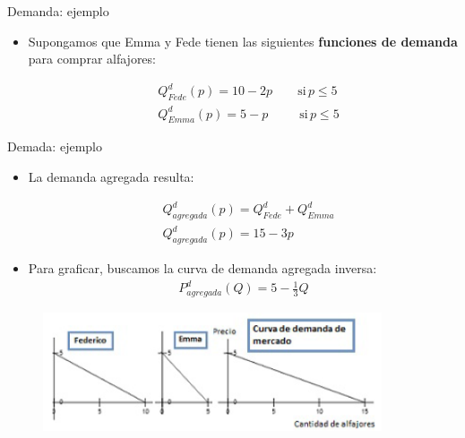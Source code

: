 \documentclass{beamer}
\begin{document}
\begin{frame}{Demanda: ejemplo}
    \begin{itemize}
        \item Supongamos que Emma y Fede tienen las siguientes \textbf{funciones de demanda} para comprar alfajores: 
        
    \begin{align*}
        &Q^{d}_{Fede}(p) = 10-2p \quad \quad \text{si} \, p \leq 5\\
        &Q^{d}_{Emma}(p) = 5-p  \,\,\, \quad \quad \text{si} \, p \leq 5
    \end{align*}
    \end{itemize}
\end{frame}

\begin{frame}{Demada: ejemplo}
   \begin{itemize}
       \item La demanda agregada resulta:
       
\begin{align*}
    &Q_{agregada}^{d}(p) = Q^{d}_{Fede} + Q^{d}_{Emma}\\
    &Q_{agregada}^{d}(p) = 15 - 3p
\end{align*}
    \item Para graficar, buscamos la curva de demanda agregada inversa: 
\begin{align*}
    P_{agregada}^{d}(Q) = 5-\frac{1}{3}Q
\end{align*}
   \end{itemize} 
\begin{figure}
\includegraphics[width=10cm]{figures1/demanda_alfajores.png}
\end{figure}
\end{frame}   
\end{document}
